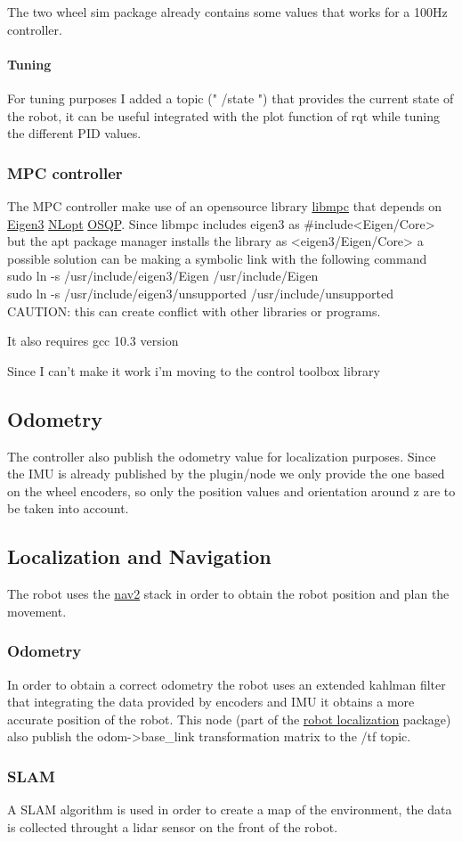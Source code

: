 \documentclass[a4paper, 7px]{article}
\begin{document}
The two wheel sim package already contains some values that works for a 100Hz controller.

\paragraph{Tuning}
For tuning purposes I added a topic (" /state ") that provides the current state of the robot, it can be useful integrated with the plot function of rqt while tuning the different PID values.

\subsubsection{MPC controller}
The MPC controller make use of an opensource library \href{https://github.com/nicolapiccinelli/libmpc}{libmpc} that depends on \href{https://eigen.tuxfamily.org/index.php?title=Main_Page}{Eigen3} \href{https://nlopt.readthedocs.io/en/latest/}{NLopt} \href{https://osqp.org/docs/}{OSQP}.
Since libmpc includes eigen3 as #include<Eigen/Core> but the apt package manager installs the library as <eigen3/Eigen/Core> a possible solution can be making a symbolic link with the following command\\
sudo ln -s /usr/include/eigen3/Eigen /usr/include/Eigen\\
sudo ln -s /usr/include/eigen3/unsupported /usr/include/unsupported\\
CAUTION: this can create conflict with other libraries or programs.

It also requires gcc 10.3 version

Since I can't make it work i'm moving to the control toolbox library 
\subsection{Odometry}
The controller also publish the odometry value for localization purposes. Since the IMU is already published by the plugin/node we only provide the one based on the wheel encoders, so only the position values and orientation around z are to be taken into account.

\subsection{Localization and Navigation}
The robot uses the \href{https://navigation.ros.org/index.html}{nav2} stack in order to obtain the robot position and plan the movement.

\subsubsection{Odometry}
In order to obtain a correct odometry the robot uses an extended kahlman filter that integrating the data provided by encoders and IMU it obtains a more accurate position of the robot. This node (part of the \href{https://github.com/cra-ros-pkg/robot_localization/tree/foxy-devel}{robot localization} package) also publish the odom->base_link transformation matrix to the /tf topic.

\subsubsection{SLAM}
A SLAM algorithm is used in order to create a map of the environment, the data is collected throught a lidar sensor on the front of the robot.
\end{document}
